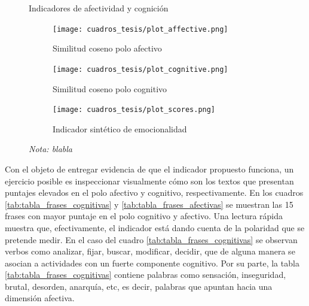 \documentclass[
  12pt,
]{article}
\begin{document}
\begin{figure}[H]
     \caption{Indicadores de afectividad y cognición}
     \centering
     \begin{subfigure}[b]{0.4\textwidth}
         \centering
         \texttt{[image: cuadros\_tesis/plot\_affective.png]}
         \caption{Similitud coseno polo afectivo}
         \label{fig:similitud_afectivo}
     \end{subfigure}
     \begin{subfigure}[b]{0.4\textwidth}
         \centering
         \texttt{[image: cuadros\_tesis/plot\_cognitive.png]}
         \caption{Similitud coseno polo cognitivo}
         \label{fig:similitud_cognitiva}
     \end{subfigure}
      \begin{subfigure}[b]{0.6\textwidth}
         \centering
         \texttt{[image: cuadros\_tesis/plot\_scores.png]}
         \caption{Indicador sintético de emocionalidad}
         \label{fig:sintetico_emocionalidad}
     \end{subfigure}
     \label{fig:similitud_polos}
     \caption*{\footnotesize{\textit{Nota: blabla} }}
\end{figure}

Con el objeto de entregar evidencia de que el indicador propuesto
funciona, un ejercicio posible es inspeccionar visualmente cómo son los
textos que presentan puntajes elevados en el polo afectivo y cognitivo,
respectivamente. En los cuadros \ref{tab:tabla_frases_cognitivas} y
\ref{tab:tabla_frases_afectivas} se muestran las 15 frases con mayor
puntaje en el polo cognitivo y afectivo. Una lectura rápida muestra que,
efectivamente, el indicador está dando cuenta de la polaridad que se
pretende medir. En el caso del cuadro \ref{tab:tabla_frases_cognitivas}
se observan verbos como analizar, fijar, buscar, modificar, decidir, que
de alguna manera se asocian a actividades con un fuerte componente
cognitivo. Por su parte, la tabla \ref{tab:tabla_frases_cognitivas}
contiene palabras como sensación, inseguridad, brutal, desorden,
anarquía, etc, es decir, palabras que apuntan hacia una dimensión
afectiva.
\end{document}
